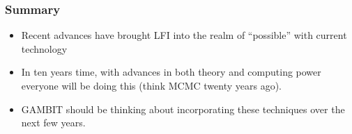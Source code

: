 \documentclass[%
    9pt,
]{beamer}
\begin{document}
\begin{frame}
    \frametitle{Summary}
    \begin{itemize}
        \item Recent advances have brought LFI into the realm of ``possible'' with current technology
        \item In ten years time, with advances in both theory and computing power everyone will be doing this (think MCMC twenty years ago).
        \item GAMBIT should be thinking about incorporating these techniques over the next few years.
    \end{itemize}
\end{frame}
\end{document}
